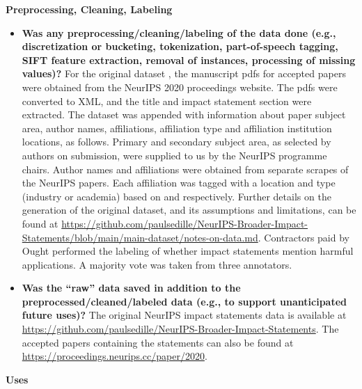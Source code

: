 \documentclass{article}
\begin{document}
\textbf{Preprocessing, Cleaning, Labeling}

\begin{itemize}
    \item \textbf{Was any preprocessing/cleaning/labeling of the data done (e.g., discretization or bucketing, tokenization, part-of-speech tagging, SIFT feature extraction, removal of instances, processing of missing values)?} For the original dataset \citep{ashurst2021aiethics}, the manuscript pdfs for accepted papers were obtained from the NeurIPS 2020 proceedings website. The pdfs were converted to XML, and  
the title and impact statement section were extracted. The dataset was appended with information about paper subject area, author names,  affiliations, affiliation type and affiliation institution locations, as follows. Primary and secondary subject area, as selected by authors on submission, were supplied to us by the NeurIPS programme chairs. Author names and affiliations were obtained from separate scrapes of the NeurIPS papers. Each affiliation was tagged with a location and type (industry or academia) based on \citep{neurips_2020_locations} and \citep{affiliation_type_google_sheet} respectively. Further details on the generation of the original dataset, and its assumptions and limitations, can be found at \href{https://github.com/paulsedille/NeurIPS-Broader-Impact-Statements/blob/main/main-dataset/notes-on-data.md}{https://github.com/paulsedille/NeurIPS-Broader-Impact-Statements/blob/main/main-dataset/notes-on-data.md}. Contractors paid by Ought performed the labeling of whether impact statements mention harmful applications. A majority vote was taken from three annotators.
    \item \textbf{Was the “raw” data saved in addition to the preprocessed/cleaned/labeled data (e.g., to support unanticipated future uses)?} The original NeurIPS impact statements data is available at \href{https://github.com/paulsedille/NeurIPS-Broader-Impact-Statements}{https://github.com/paulsedille/NeurIPS-Broader-Impact-Statements}. The accepted papers containing the statements can also be found at \href{https://proceedings.neurips.cc/paper/2020}{https://proceedings.neurips.cc/paper/2020}.
\end{itemize}

\textbf{Uses}
\end{document}
